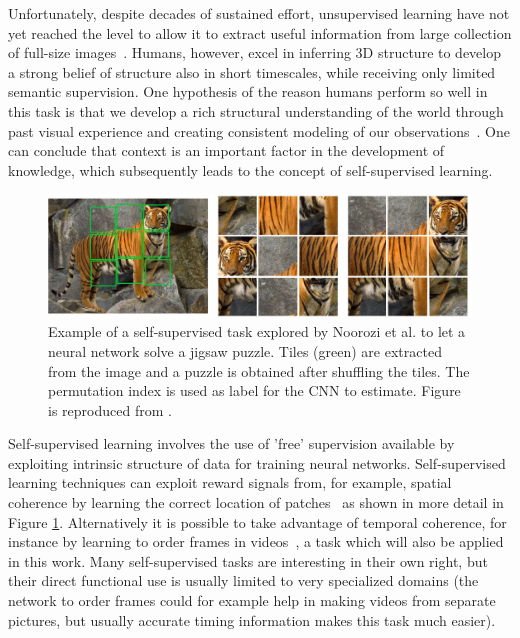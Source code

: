 Unfortunately, despite decades of sustained effort, unsupervised learning have not yet reached the level to allow it to extract useful information from large collection of full-size images~\cite{doersch2015}. Humans, however, excel in inferring 3D structure to develop a strong belief of structure also in short timescales, while receiving only limited semantic supervision. One hypothesis of the reason humans perform so well in this task is that we develop a rich structural understanding of the world through past visual experience and creating consistent modeling of our observations~\cite{zhou2017}. One can conclude that context is an important factor in the development of knowledge, which subsequently leads to the concept of self-supervised learning.

\begin{figure}[t]
\centering
\includegraphics[width=\textwidth]{images/jigsaw_puzzle.png}
\caption{Example of a self-supervised task explored by Noorozi et al.\cite{noroozi2016} to let a neural network solve a jigsaw puzzle. Tiles (green) are extracted from the image and a puzzle is obtained after shuffling the tiles. The permutation index is used as label for the CNN to estimate. Figure is reproduced from \cite{noroozi2016}.}
\label{fig:jigsaw}
\end{figure}

Self-supervised learning involves the use of 'free' supervision available by exploiting intrinsic structure of data for training neural networks. Self-supervised learning techniques can exploit reward signals from, for example, spatial coherence by learning the correct location of patches~\cite{doersch2015, noroozi2016} as shown in more detail in Figure \ref{fig:jigsaw}. Alternatively it is possible to take advantage of temporal coherence, for instance by learning to order frames in videos~\cite{misra2016, lee2017}, a task which will also be applied in this work. Many self-supervised tasks are interesting in their own right, but their direct functional use is usually limited to very specialized domains (the network to order frames could for example help in making videos from separate pictures, but usually accurate timing information makes this task much easier).

